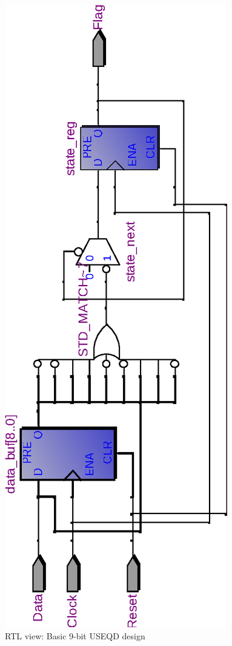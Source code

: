 \documentclass[10pt,a4paper]{report}
\begin{document}
\begin{figure} \center

\includegraphics[scale=0.8,angle=-90]{graphs/seq_test1.rtl_BASIC9.eps}
\caption{\small{RTL view: Basic 9-bit USEQD design}} \label{rtl:usd:2b}


\end{figure}
\end{document}
